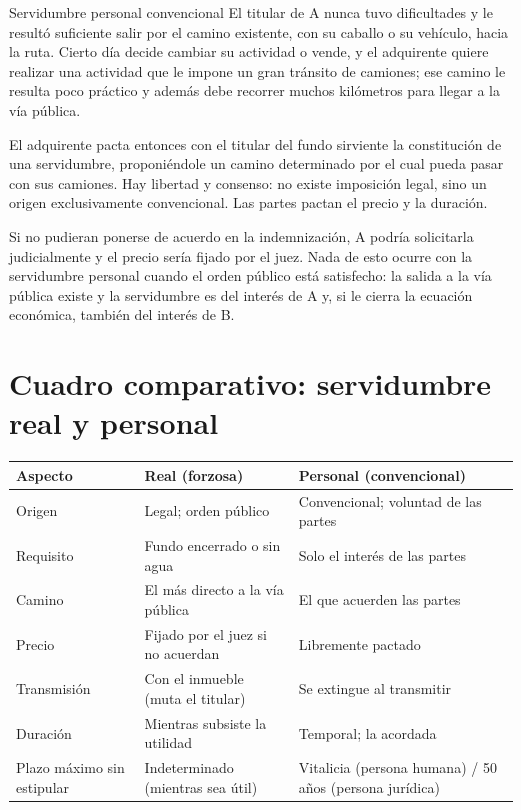 \documentclass[12pt,oneside]{book}
\begin{document}
\begin{example}{Servidumbre personal convencional}
El titular de A nunca tuvo dificultades y le resultó suficiente salir por el camino existente, con su caballo o su vehículo, hacia la ruta. Cierto día decide cambiar su actividad o vende, y el adquirente quiere realizar una actividad que le impone un gran tránsito de camiones; ese camino le resulta poco práctico y además debe recorrer muchos kilómetros para llegar a la vía pública.

El adquirente pacta entonces con el titular del fundo sirviente la constitución de una servidumbre, proponiéndole un camino determinado por el cual pueda pasar con sus camiones. Hay libertad y consenso: no existe imposición legal, sino un origen exclusivamente convencional. Las partes pactan el precio y la duración.

Si no pudieran ponerse de acuerdo en la indemnización, A podría solicitarla judicialmente y el precio sería fijado por el juez. Nada de esto ocurre con la servidumbre personal cuando el orden público está satisfecho: la salida a la vía pública existe y la servidumbre es del interés de A y, si le cierra la ecuación económica, también del interés de B.
\end{example}

\section{Cuadro comparativo: servidumbre real y personal}

\begin{table}[H]
\centering
\small
\renewcommand{\arraystretch}{1.3}
\begin{tabularx}{\textwidth}{
    >{\raggedright\arraybackslash}p{}
    >{\raggedright\arraybackslash}X
    >{\raggedright\arraybackslash}X
}
\toprule
\textbf{Aspecto} & \textbf{Real (forzosa)} & \textbf{Personal (convencional)} \\
\midrule
Origen & Legal; orden público & Convencional; voluntad de las partes \\
Requisito & Fundo encerrado o sin agua & Solo el interés de las partes \\
Camino & El más directo a la vía pública & El que acuerden las partes \\
Precio & Fijado por el juez si no acuerdan & Libremente pactado \\
Transmisión & Con el inmueble (muta el titular) & Se extingue al transmitir \\
Duración & Mientras subsiste la utilidad & Temporal; la acordada \\
Plazo máximo sin estipular & Indeterminado (mientras sea útil) & Vitalicia (persona humana) / 50 años (persona jurídica) \\
\bottomrule
\end{tabularx}
\end{table}
\end{document}
